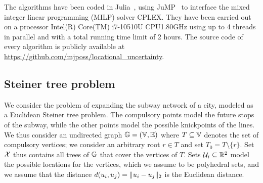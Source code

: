 \documentclass[12pt]{article}
\begin{document}
The algorithms have been coded in Julia~\citep{bezanson2012julia}, using JuMP~\citep{DunningHuchetteLubin2017} to interface the mixed integer linear programming (MILP) solver CPLEX. They have been carried out on a processor Intel(R) Core(TM) i7-10510U CPU\@1.80GHz using up to 4 threads in parallel and with a total running time limit of 2 hours. The source code of every algorithm is publicly available at \url{https://github.com/mjposs/locational\_uncertainty}.

\subsection{Steiner tree problem}

We consider the problem of expanding the subway network of a city, modeled as a Euclidean Steiner tree problem. The compulsory points model the future stops of the subway, while the other points model the possible knickpoints of the lines. 
We thus consider an undirected graph $\mathbb{G}=(\mathbb{V},\mathbb{E})$ where $T\subseteq \mathbb{V}$ denotes the set of compulsory vertices; we consider an arbitrary root $r\in T$ and set $T_0=T\setminus\{r\}$. 
Set $\mathcal{X}$ thus contains all trees of $\mathbb{G}$ that cover the vertices of $T$.
Sets $\mathcal{U}_i\subseteq\mathbb{R}^2$ model the possible locations for the vertices, which we assume to be polyhedral sets, and we assume that the distance $d(u_i,u_j)=\|u_i-u_j\|_2$ is the Euclidean distance. 
\end{document}

